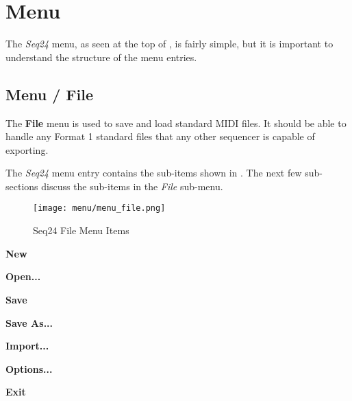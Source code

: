 %
%
%

\section{Menu}
\label{sec:seq24_menu}

   The \textsl{Seq24} menu, as seen at the top of
   ,
   is fairly simple, but it is important to understand the
   structure of the menu entries.

\subsection{Menu / File}
\label{subsec:seq24_menu_file}

   The \textbf{File} menu is used to save and load standard 
   MIDI files.  It should be able to handle any 
   Format 1 standard files that any other sequencer 
   is capable of exporting.  

   The \textsl{Seq24}
   menu entry contains the sub-items shown in
   .
   The next few sub-sections discuss the sub-items in the 
   \textsl{File} sub-menu.

\begin{figure}[H]
   \centering 
   \texttt{[image: menu/menu\_file.png]}
   \caption{Seq24 File Menu Items}
   \label{fig:seq24_menu_file_items}
\end{figure}

   \begin{enumber}
      \item \textbf{New}
      \item \textbf{Open...}
      \item \textbf{Save}
      \item \textbf{Save As...}
      \item \textbf{Import...}
      \item \textbf{Options...}
      \item \textbf{Exit}
   \end{enumber}

